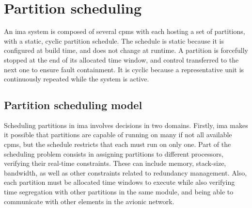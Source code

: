 \documentclass[main.tex]{subfiles}
\begin{document}
\section{Partition scheduling}

An \gls{ima} system is composed of several \glspl{cpm} with each hosting a set of partitions, with a static, cyclic partition schedule.
The schedule is static because it is configured at build time, and does not change at runtime.
A partition is forcefully stopped at the end of its allocated time window, and control transferred to the next one to ensure fault containment.
It is cyclic because a representative unit is continuously repeated while the system is active.

\subsection{Partition scheduling model}

Scheduling partitions in \gls{ima} involves decisions in two domains.
Firstly, \gls{ima} makes it possible that partitions are capable of running on many if not all available \glspl{cpm}, but the schedule restricts that each must run on only one.
Part of the scheduling problem consists in assigning partitions to different processors, verifying their real-time constraints.
These can include memory, stack-size, bandwidth, as well as other constraints related to redundancy management.
Also, each partition must be allocated time windows to execute while also verifying time segregation with other partitions in the same module, and being able to communicate with other elements in the avionic network.
\end{document}
